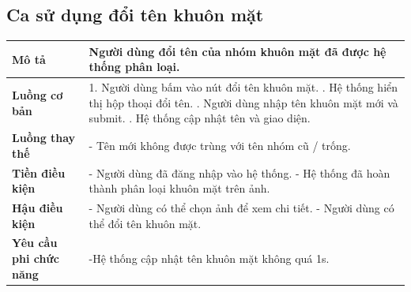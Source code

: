 \subsection{Ca sử dụng đổi tên khuôn mặt}

\vspace{0.5cm}

\noindent 
\begin{tabularx}{\linewidth}{| l | X |} 
\hline 
\textbf{Mô tả} & Người dùng đổi tên của nhóm khuôn mặt đã được hệ thống phân loại. \\
\hline 
\textbf{Luồng cơ bản} & 1. Người dùng bấm vào nút đổi tên khuôn mặt. \newline
                       2. Hệ thống hiển thị hộp thoại đổi tên. \newline
                       3. Người dùng nhập tên khuôn mặt mới và submit. \newline
                       5. Hệ thống cập nhật tên và giao diện. \\
\hline
\textbf{Luồng thay thế} & - Tên mới không được trùng với tên nhóm cũ / trống. \\
\textbf{Tiền điều kiện} & - Người dùng đã đăng nhập vào hệ thống. \newline
                          - Hệ thống đã hoàn thành phân loại khuôn mặt trên ảnh. \\
\textbf{Hậu điều kiện} & - Người dùng có thể chọn ảnh để xem chi tiết. \newline
                          - Người dùng có thể đổi tên khuôn mặt. \\
\hline 
\textbf{Yêu cầu phi chức năng} & -Hệ thống cập nhật tên khuôn mặt không quá 1s. \\
\hline 
\end{tabularx}

\vspace{0.8cm}

